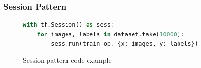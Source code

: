 




\subsubsection{Session Pattern}\label{sec:session}

\begin{figure}[!ht]
\begin{lstlisting}[language=Python]
with tf.Session() as sess:
    for images, labels in dataset.take(10000):
        sess.run(train_op, {x: images, y: labels})
\end{lstlisting}
\caption{Session pattern code example}
\label{fig:sessionpattern}
\end{figure}

